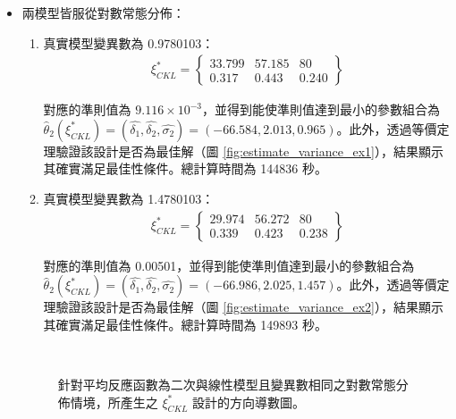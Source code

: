 \begin{itemize}
\item 兩模型皆服從對數常態分佈：

\begin{enumerate}

\item 真實模型變異數為 0.9780103：
\begin{align*}
\xi^*_{CKL} = \left\{\begin{array}{ccc}
33.799 & 57.185 & 80 \\
0.317 & 0.443 & 0.240
\end{array}\right\}
\end{align*}

對應的準則值為 $9.116\times 10^{-3}$，並得到能使準則值達到最小的參數組合為 $\hat{\theta}_2(\xi^*_{CKL})=(\hat{\delta_1},\hat{\delta_2},\hat{\sigma_2})=(-66.584, 2.013, 0.965)$。此外，透過等價定理驗證該設計是否為最佳解（圖 \ref{fig:estimate_variance_ex1}），結果顯示其確實滿足最佳性條件。總計算時間為 144836 秒。

\item 真實模型變異數為 1.4780103：
\begin{align*}
\xi^*_{CKL} = \left\{\begin{array}{ccc}
29.974 & 56.272 & 80 \\
0.339 & 0.423 & 0.238
\end{array}\right\}
\end{align*}

對應的準則值為 0.00501，並得到能使準則值達到最小的參數組合為 $\hat{\theta}_2(\xi^*_{CKL})=(\hat{\delta_1},\hat{\delta_2},\hat{\sigma_2})=(-66.986, 2.025, 1.457)$。此外，透過等價定理驗證該設計是否為最佳解（圖 \ref{fig:estimate_variance_ex2}），結果顯示其確實滿足最佳性條件。總計算時間為 149893 秒。

\end{enumerate}

\begin{figure}[H]
\centering
{}
 \\
\caption{針對平均反應函數為二次與線性模型且變異數相同之對數常態分佈情境，所產生之 $\xi^*_{CKL}$ 設計的方向導數圖。}
\label{fig:DeviceA_estimate_variance_lognormal}
\end{figure}


\end{itemize}
